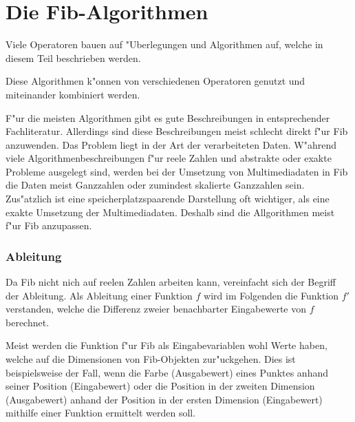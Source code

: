 %
%
%
%

\newpage
\part{Die Fib-Algorithmen}
\label{partFibAlgorithms}

Viele Operatoren bauen auf "Uberlegungen und Algorithmen auf, welche in diesem Teil beschrieben werden.

Diese Algorithmen k"onnen von verschiedenen Operatoren genutzt und miteinander kombiniert werden.

F"ur die meisten Algorithmen gibt es gute Beschreibungen in entsprechender Fachliteratur. Allerdings sind diese Beschreibungen meist schlecht direkt f"ur Fib anzuwenden.
Das Problem liegt in der Art der verarbeiteten Daten. W"ahrend viele Algorithmenbeschreibungen f"ur reele Zahlen und abstrakte oder exakte Probleme ausgelegt sind, werden bei der Umsetzung von Multimediadaten in Fib die Daten meist Ganzzahlen oder zumindest skalierte Ganzzahlen sein. Zus"atzlich ist eine speicherplatzspaarende Darstellung oft wichtiger, als eine exakte Umsetzung der Multimediadaten.
Deshalb sind die Allgorithmen meist f"ur Fib anzupassen.


\section{Ableitung}
\label{secDerivate}

Da Fib nicht nich auf reelen Zahlen arbeiten kann, vereinfacht sich der Begriff der Ableitung.
Als Ableitung einer Funktion $f$ wird im Folgenden die Funktion $f'$ verstanden, welche die Differenz zweier benachbarter Eingabewerte von $f$ berechnet.

Meist werden die Funktion f"ur Fib als Eingabevariablen wohl Werte haben, welche auf die Dimensionen von Fib-Objekten zur"uckgehen. Dies ist beispielsweise der Fall, wenn die Farbe (Ausgabewert) eines Punktes anhand seiner Position (Eingabewert) oder die Position in der zweiten Dimension (Ausgabewert) anhand der Position in der ersten Dimension (Eingabewert) mithilfe einer Funktion ermittelt werden soll.

